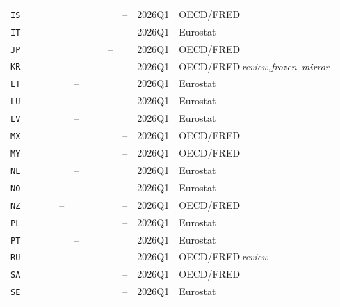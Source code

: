 \documentclass[11pt]{article}
\newcommand{\cmark}{{\color{green!55!black}\checkmark}}
\theoremstyle{definition}
\theoremstyle{remark}
\begin{document}
\begin{landscape}
{\begin{longtable}{@{}l ccccccccc l l@{}}
\texttt{IS} & \cmark & \cmark & \cmark & \cmark & \cmark & \cmark & \cmark & \cmark & -- & 2026Q1 & OECD/FRED \\
\texttt{IT} & \cmark & \cmark & \cmark & \cmark & -- & \cmark & \cmark & \cmark & \cmark & 2026Q1 & Eurostat \\
\texttt{JP} & \cmark & \cmark & \cmark & \cmark & \cmark & \cmark & \cmark & -- & \cmark & 2026Q1 & OECD/FRED \\
\texttt{KR} & \cmark & \cmark & \cmark & \cmark & \cmark & \cmark & \cmark & -- & -- & 2026Q1 & OECD/FRED\,\footnotesize\textit{review,frozen~mirror} \\
\texttt{LT} & \cmark & \cmark & \cmark & \cmark & -- & \cmark & \cmark & \cmark & \cmark & 2026Q1 & Eurostat \\
\texttt{LU} & \cmark & \cmark & \cmark & \cmark & -- & \cmark & \cmark & \cmark & \cmark & 2026Q1 & Eurostat \\
\texttt{LV} & \cmark & \cmark & \cmark & \cmark & -- & \cmark & \cmark & \cmark & \cmark & 2026Q1 & Eurostat \\
\texttt{MX} & \cmark & \cmark & \cmark & \cmark & \cmark & \cmark & \cmark & \cmark & -- & 2026Q1 & OECD/FRED \\
\texttt{MY} & \cmark & \cmark & \cmark & \cmark & \cmark & \cmark & \cmark & \cmark & -- & 2026Q1 & OECD/FRED \\
\texttt{NL} & \cmark & \cmark & \cmark & \cmark & -- & \cmark & \cmark & \cmark & \cmark & 2026Q1 & Eurostat \\
\texttt{NO} & \cmark & \cmark & \cmark & \cmark & \cmark & \cmark & \cmark & \cmark & -- & 2026Q1 & Eurostat \\
\texttt{NZ} & \cmark & \cmark & \cmark & -- & \cmark & \cmark & \cmark & \cmark & -- & 2026Q1 & OECD/FRED \\
\texttt{PL} & \cmark & \cmark & \cmark & \cmark & \cmark & \cmark & \cmark & \cmark & -- & 2026Q1 & Eurostat \\
\texttt{PT} & \cmark & \cmark & \cmark & \cmark & -- & \cmark & \cmark & \cmark & \cmark & 2026Q1 & Eurostat \\
\texttt{RU} & \cmark & \cmark & \cmark & \cmark & \cmark & \cmark & \cmark & \cmark & -- & 2026Q1 & OECD/FRED\,\footnotesize\textit{review} \\
\texttt{SA} & \cmark & \cmark & \cmark & \cmark & \cmark & \cmark & \cmark & \cmark & -- & 2026Q1 & OECD/FRED \\
\texttt{SE} & \cmark & \cmark & \cmark & \cmark & \cmark & \cmark & \cmark & \cmark & -- & 2026Q1 & Eurostat \\

\end{longtable}}
\end{landscape}
\end{document}
